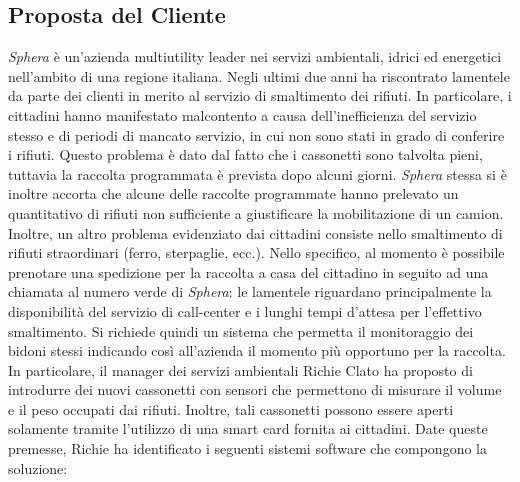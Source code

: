 \subsection{Proposta del Cliente}
\textit{Sphera} è un'azienda multiutility leader nei servizi ambientali, idrici ed energetici nell'ambito di una regione italiana.
Negli ultimi due anni ha riscontrato lamentele da parte dei clienti in merito al servizio di smaltimento dei rifiuti.
In particolare, i cittadini hanno manifestato malcontento a causa dell'inefficienza del servizio stesso e di periodi di
mancato servizio, in cui non sono stati in grado di conferire i rifiuti. Questo problema è dato dal fatto che i cassonetti
sono talvolta pieni, tuttavia la raccolta programmata è prevista dopo alcuni giorni. \textit{Sphera} stessa si è inoltre
accorta che alcune delle raccolte programmate hanno prelevato un quantitativo di rifiuti non sufficiente a giustificare
la mobilitazione di un camion.
Inoltre, un altro problema evidenziato dai cittadini consiste nello smaltimento di rifiuti straordinari (ferro, sterpaglie,
ecc.). Nello specifico, al momento è possibile prenotare una spedizione per la raccolta a casa del cittadino in seguito ad
una chiamata al numero verde di \textit{Sphera}: le lamentele riguardano principalmente la disponibilità del servizio di
call-center e i lunghi tempi d'attesa per l'effettivo smaltimento.
Si richiede quindi un sistema che permetta il monitoraggio dei bidoni stessi indicando così all'azienda il momento più
opportuno per la raccolta. In particolare, il manager dei servizi ambientali Richie Clato ha proposto di introdurre dei
nuovi cassonetti con sensori che permettono di misurare il volume e il peso occupati dai rifiuti. Inoltre, tali cassonetti
possono essere aperti solamente tramite l'utilizzo di una smart card fornita ai cittadini.
Date queste premesse, Richie ha identificato i seguenti sistemi software che compongono la soluzione:
